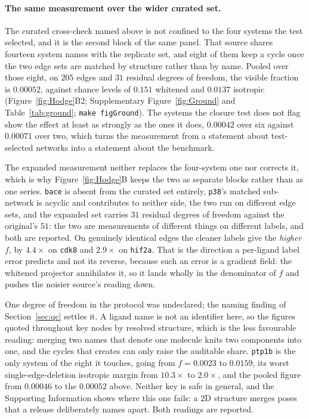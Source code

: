 \paragraph{The same measurement over the wider curated set.} The curated cross-check named above is not confined to the four systems the test selected, and it
is the second block of the same panel. That source shares fourteen system names with the replicate
set, and eight of them keep a cycle once the two edge sets are matched by structure rather than by
name. Pooled over those eight, on $205$ edges and $31$ residual degrees of freedom, the visible
fraction is $0.00052$, against chance levels of $0.151$ whitened and $0.0137$ isotropic
(Figure~\ref{fig:Hodge}B2; Supplementary Figure~\ref{fig:Ground} and Table~\ref{tab:ground};
\texttt{make figGround}). The systems the closure test does not flag show the effect at least as
strongly as the ones it does, $0.00042$ over six against $0.00071$ over two, which turns the
measurement from a statement about test-selected networks into a statement about the benchmark.

The expanded measurement neither replaces the four-system one nor corrects it, which is why
Figure~\ref{fig:Hodge}B keeps the two as separate blocks rather than as one series. \texttt{bace}
is absent from the curated set entirely, \texttt{p38}'s matched sub-network is acyclic and
contributes to neither side, the two run on different edge sets, and the expanded
set carries $31$ residual degrees of freedom against the original's $51$: the two are measurements
of different things on different labels, and both are reported. On genuinely identical edges the
cleaner labels give the \emph{higher} $f$, by $4.4\times$ on \texttt{cdk8} and $2.9\times$ on
\texttt{hif2a}. That is the direction a per-ligand label error predicts and not its reverse,
because such an error is a gradient field: the whitened projector annihilates it, so it lands
wholly in the denominator of $f$ and pushes the noisier source's reading down.

One degree of freedom in the protocol was undeclared; the naming finding of
Section~\ref{sec:qc} settles it. A ligand name is not an identifier here, so the figures quoted
throughout key nodes by resolved structure, which is the less favourable reading: merging two
names that denote one molecule knits two components into one, and the cycles that creates can only
raise the auditable share. \texttt{ptp1b} is the only system of the eight it touches, going from $f=0.0023$
to $0.0159$, its worst single-edge-deletion isotropic margin from $10.3\times$ to $2.0\times$,
and the pooled figure from $0.00046$ to the $0.00052$ above. Neither key is safe in general, and
the Supporting Information shows where this one fails: a $2$D structure merges poses that a release deliberately names apart. Both readings are reported.

